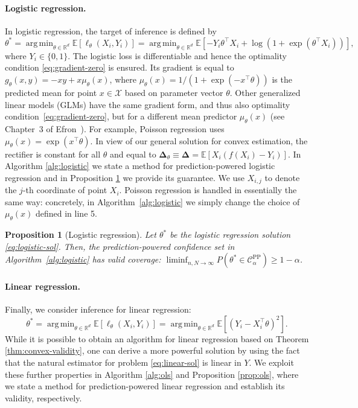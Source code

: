 \documentclass[10pt]{article}
\newtheorem{prop}{Proposition}
\def\R{\mathbb{R}}
\def\E{\mathbb{E}}
\newcommand{\X}{\mathcal{X}}
\newcommand{\rec}{\mathbf{\Delta}}
\newcommand{\CPP}{\mathcal{C}^{\mathrm{PP}}}
\DeclareMathOperator*{\argmin}{arg\,min}
\begin{document}
\paragraph{Logistic regression.} In logistic regression, the target of inference is defined by
\begin{equation}
\label{eq:logistic-sol}
    \theta^* = \argmin_{\theta\in\R^d} \E[\ell_\theta(X_i,Y_i)] = \argmin_{\theta\in\R^d} \E\left[-Y_i \theta^\top X_i + \log(1 + \exp(\theta^\top X_i))\right],
\end{equation}
where $Y_i\in\{0,1\}$. The logistic loss is differentiable and hence the optimality condition \eqref{eq:gradient-zero} is ensured. Its gradient is equal to $g_{\theta}(x,y) = -x y + x \mu_{\theta}(x)$,
where $\mu_\theta(x) = 1 / (1 + \exp(-x^\top \theta))$ is the predicted mean for point $x\in\X$ based on parameter vector $\theta$. Other generalized linear models (GLMs) have the same gradient form, and thus also optimality condition~\eqref{eq:gradient-zero}, but for a different mean predictor $\mu_\theta(x)$ (see Chapter~3 of Efron~\cite{efron_2022}). For example, Poisson regression uses $\mu_\theta(x) = \exp(x^\top \theta)$. In view of our general solution for convex estimation, the rectifier is constant for all $\theta$ and equal to $\rec_{\theta} \equiv \rec = \mathbb{E}\left[X_i (f(X_i) - Y_i)\right]$.
In Algorithm \ref{alg:logistic} we state a method for prediction-powered logistic regression and in Proposition \ref{prop:logistic} we provide its guarantee. We use $X_{i,j}$ to denote the $j$-th coordinate of point $X_i$. Poisson regression is handled in essentially the same way: concretely, in Algorithm~\ref{alg:logistic} we simply change the choice of $\mu_\theta(x)$ defined in line 5.

\begin{prop}[Logistic regression]
\label{prop:logistic}
Let $\theta^*$ be the logistic regression solution \eqref{eq:logistic-sol}. Then, the prediction-powered confidence set in Algorithm~\ref{alg:logistic} has valid coverage: $\liminf_{n,N\rightarrow\infty}P\left(\theta^* \in  \CPP_\alpha\right) \ge 1-\alpha$.
\end{prop}

\paragraph{Linear regression.}
Finally, we consider inference for linear regression:
\begin{equation}
\label{eq:linear-sol}
\theta^* = \argmin_{\theta\in\R^d} \E[\ell_\theta(X_i,Y_i)] = \argmin_{\theta\in\R^d} \E [(Y_i - X_i^\top \theta)^2].
\end{equation}
While it is possible to obtain an algorithm for linear regression based on Theorem \ref{thm:convex-validity}, one can derive a more powerful solution by using the fact that the natural estimator for problem \eqref{eq:linear-sol} is linear in $Y$. We exploit these further properties in Algorithm \ref{alg:ols} and Proposition \ref{prop:ols}, where we state a method for prediction-powered linear regression and establish its validity, respectively.
\end{document}
